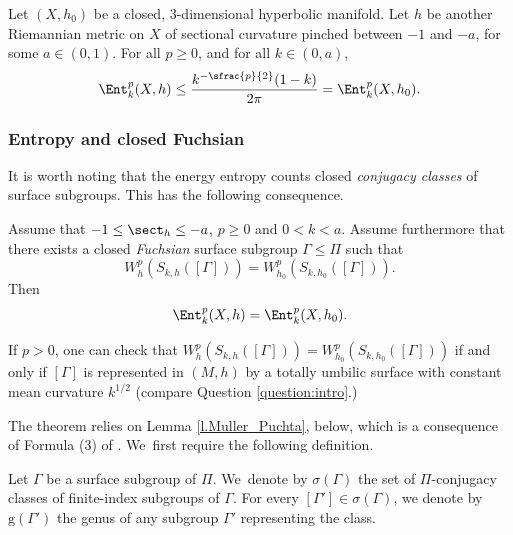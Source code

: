 \begin{lemma}\label{l_inequality_entropy}
Let $(X,h_0)$ be a closed, $3$\nobreakdash-dimensional hyperbolic manifold. Let $h$ be another Riemannian metric on $X$ of sectional curvature pinched between $-1$ and $-a$, for some $a\in(0,1)$. For all $p\geq 0$, and for all $k\in(0,a)$,
\begin{equation*}
\Ent^{p}_{k}(X,h)\leq\frac{k^{-\sfrac{p}{2}}(1-k)}{2\pi}=\Ent^{p}_{k}(X,h_0).
\end{equation*}
\end{lemma}

\subsubsection{Entropy and closed Fuchsian \protect\ksurfaces} It is worth noting that the \ksurface energy entropy counts closed \emph{conjugacy classes} of surface subgroups. This has the following consequence.

\begin{theorem}\label{th.totally_umb_implies_big_entropy}
Assume that $-1\leq\sect_h\leq-a$, $p\geq 0$ and $0<k<a$. Assume furthermore that there exists a closed \emph{Fuchsian} surface subgroup $\Gamma\leq\Pi$ such that
\begin{equation*}
W^{p}_{h}(S_{k,h}([\Gamma]))=W^{p}_{h_0}(S_{k,h_0}([\Gamma])).
\end{equation*}
Then
\begin{equation*}
\Ent^{p}_{k}(X,h)=\Ent^{p}_{k}(X,h_0).
\end{equation*}
\end{theorem}

\begin{remark}
If $p>0$, one can check that $W^{p}_{h}(S_{k,h}([\Gamma]))=W^{p}_{h_0}(S_{k,h_0}([\Gamma]))$ if and only if $[\Gamma]$ is represented in $(M,h)$ by a totally umbilic surface with constant mean curvature $k^{1/2}$ (compare Question \ref{question:intro}.)
\end{remark}

The theorem relies on Lemma \ref{l.Muller_Puchta}, below, which is a consequence of Formula (3) of \cite{Muller_Puchta}. We~first require the following definition.

\begin{defi}\label{d.conj_classes}
Let $\Gamma$ be a surface subgroup of $\Pi$. We~denote by $\sigma(\Gamma)$ the set of $\Pi$-conjugacy classes of finite-index subgroups of $\Gamma$. For every $[\Gamma']\in\sigma(\Gamma)$, we denote by $\mathrm{g}(\Gamma')$ the genus of any subgroup $\Gamma'$ representing the class.
\end{defi}

